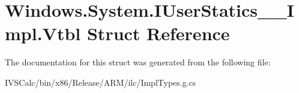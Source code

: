 \hypertarget{struct_windows_1_1_system_1_1_i_user_statics_____impl_1_1_vtbl}{}\section{Windows.\+System.\+I\+User\+Statics\+\_\+\+\_\+\+Impl.\+Vtbl Struct Reference}
\label{struct_windows_1_1_system_1_1_i_user_statics_____impl_1_1_vtbl}


The documentation for this struct was generated from the following file\+:\begin{DoxyCompactItemize}
\item 
I\+V\+S\+Calc/bin/x86/\+Release/\+A\+R\+M/ilc/Impl\+Types.\+g.\+cs\end{DoxyCompactItemize}
